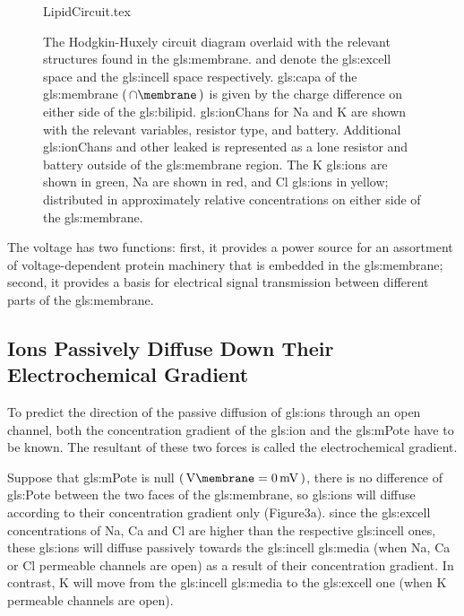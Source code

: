 \documentclass[../../Orator]{subfiles}
\begin{document}
\vspace{1em}

\begin{figure}[ht]
    \centering
    {LipidCircuit.tex}
    \caption{The Hodgkin-Huxely circuit diagram overlaid with the relevant structures found in the \gls{gls:membrane}.  and  denote the \gls{gls:excell} space and the \gls{gls:incell} space respectively. \Gls{gls:capa} of the \gls{gls:membrane} \(\br{\unit{\cap\membrane}}\) is given by the charge difference on either side of the \gls{gls:bilipid}. \Glspl{gls:ionChan} for \gls{Na} and \gls{K} are shown with the relevant variables, resistor type, and battery. Additional \glspl{gls:ionChan} and other leaked is represented as a lone resistor and battery outside of the \gls{gls:membrane} region. The \gls{K} \glspl{gls:ion} are shown in green, \gls{Na} are shown in red, and \gls{Cl} \glspl{gls:ion} in yellow; distributed in approximately relative concentrations on either side of the \gls{gls:membrane}. }\label{fig:MembraneCircut}
\end{figure}


The voltage has two functions: first, it provides a power source for an assortment of voltage-dependent protein machinery that is embedded in the \gls{gls:membrane}; second, it provides a basis for electrical signal transmission between different parts of the \gls{gls:membrane}.

\subsection{Ions Passively Diffuse Down Their Electrochemical Gradient}
To predict the direction of the passive diffusion of \glspl{gls:ion} through an open channel, both the concentration gradient of the \gls{gls:ion} and the \gls{gls:mPote} have to be known. The resultant of these two forces is called the electrochemical gradient.

Suppose that \gls{gls:mPote} is null \(\br{\unit{\V\membrane}=\qty{0}{\mV}}\), there is no difference of \gls{gls:Pote} between the two faces of the \gls{gls:membrane}, so \glspl{gls:ion} will diffuse according to their concentration gradient only (Figure3a). since the \gls{gls:excell} concentrations of \gls{Na}, \gls{Ca} and \gls{Cl} are higher than the respective \gls{gls:incell} ones, these \glspl{gls:ion} will diffuse passively towards the \gls{gls:incell} \gls{gls:media} (when \gls{Na}, \gls{Ca} or \gls{Cl} permeable channels are open) as a result of their concentration gradient. In contrast, \gls{K} will move from the \gls{gls:incell} \gls{gls:media} to the \gls{gls:excell} one (when \gls{K} permeable channels are open). 
\end{document}
